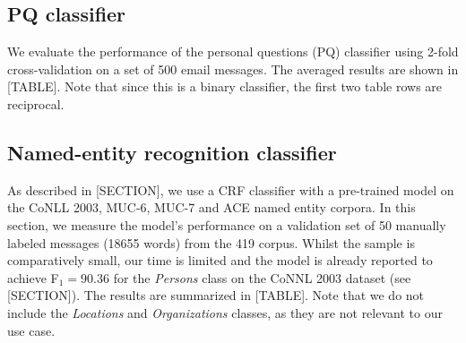 \subsection{PQ classifier}
We evaluate the performance of the personal questions (PQ) classifier using 2-fold cross-validation on a set of 500 email messages. The averaged results are shown in [TABLE]. Note that since this is a binary classifier, the first two table rows are reciprocal.
\begin{center}
\end{center}
\subsection{Named-entity recognition classifier}
As described in [SECTION], we use a CRF classifier with a pre-trained model on the CoNLL 2003, MUC-6, MUC-7 and ACE named entity corpora. In this section, we measure the model's performance on a validation set of 50 manually labeled messages (18655 words) from the 419 corpus. Whilst the sample is comparatively small, our time is limited and the model is already reported to achieve F$_{1} = 90.36$ for the \emph{Persons} class on the CoNNL 2003 dataset (see [SECTION]). The results are summarized in [TABLE]. Note that we do not include the \emph{Locations} and \emph{Organizations} classes, as they are not relevant to our use case.
\begin{center}
\end{center}

